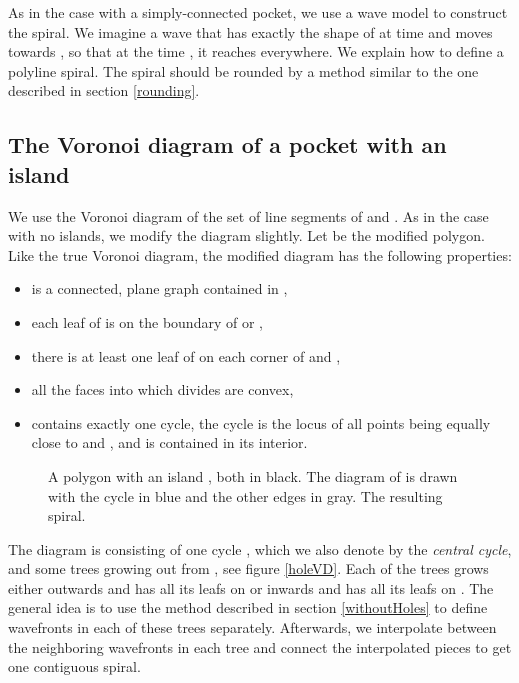 \documentclass[3p]{elsarticle}
\begin{document}
As in the case with a simply-connected pocket, we use a wave model to construct the spiral.
We imagine a wave that has exactly the shape of  at time  and moves
towards , so that at the time , it reaches  everywhere.
We explain how to define a polyline spiral. The spiral should be rounded by a method similar to the one
described in section \ref{rounding}. 

\subsection{The Voronoi diagram of a pocket with an island}

We use the Voronoi diagram of
the set of line segments of  and . As in the case with no islands, we modify the
diagram slightly. Let  be the modified polygon. Like the true Voronoi diagram,
the modified diagram  has the following properties:
\begin{itemize}
\setlength\itemsep{0em}
\item  is a connected, plane graph contained in ,
\item each leaf of  is on the boundary of  or ,
\item there is at least one leaf of  on each corner of  and ,
\item all the faces into which  divides  are convex,
\item  contains exactly one cycle,
the cycle is the locus of all points being equally close to  and , and
 is contained in its interior.
\end{itemize}

\begin{figure*}
\centering
{}\quad
{}
\caption{
 A polygon  with an island , both in black.
The diagram  of  is drawn with the cycle  in blue
and the other edges in gray.
 The resulting spiral.
}
\label{spiralWithHole}
\end{figure*}

The diagram  is consisting of one cycle , which we also denote by the \emph{central cycle},
and some trees growing out from , see figure \ref{holeVD}.
Each of the trees grows either outwards and has all
its leafs on 
or inwards and has all its leafs on .
The general idea is to use the method described in section \ref{withoutHoles}
to define wavefronts in each of these trees separately. Afterwards, we interpolate between
the neighboring wavefronts in each tree and connect the interpolated pieces to get one
contiguous spiral.
\end{document}
